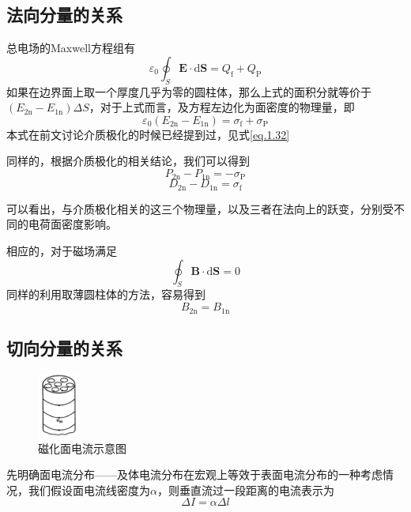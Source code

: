 		\subsection{法向分量的关系}
			总电场的Maxwell方程组有
				\begin{equation}
					\varepsilon_{0} \oint_{S} \boldsymbol{E} \cdot \mathrm{d} \boldsymbol{S}=Q_{\mathrm{f}}+Q_{\mathrm{P}}
				\end{equation}
			如果在边界面上取一个厚度几乎为零的圆柱体，那么上式的面积分就等价于$\left(E_{2 \mathrm{n}}-E_{1 \mathrm{n}}\right) \Delta S$，对于上式而言，及方程左边化为面密度的物理量，即
				\begin{equation}
					\varepsilon_{0}\left(E_{2 \mathrm{n}}-E_{1 \mathrm{n}}\right)=\sigma_{\mathrm{f}}+\sigma_{\mathrm{P}}
				\end{equation}
			本式在前文讨论介质极化的时候已经提到过，见式\ref{eq.1.32}

			同样的，根据介质极化的相关结论，我们可以得到
			\begin{equation}
				P_{2 \mathrm{n}}-P_{1 \mathrm{n}}=-\sigma_{\mathrm{P}}
			\end{equation}
			\begin{equation}
				\boxed{D_{2 \mathrm{n}}-D_{1 \mathrm{n}}=\sigma_{\mathrm{f}}}
			\end{equation}

			可以看出，与介质极化相关的这三个物理量，以及三者在法向上的跃变，分别受不同的电荷面密度影响。

			相应的，对于磁场满足
			\begin{equation}
				\oint_{S} \boldsymbol{B} \cdot \mathrm{d} \boldsymbol{S}=0
			\end{equation}
			同样的利用取薄圆柱体的方法，容易得到
			\begin{equation}
				\boxed{B_{2 \mathrm{n}}=B_{1 \mathrm{n}}}
			\end{equation}
		\subsection{切向分量的关系}
		\begin{figure}%
	      \centering
	      \includegraphics[width=0.12\textwidth]{figs/磁化面电流示意图.jpg}
	      \caption{磁化面电流示意图}
	      \end{figure}
			先明确面电流分布——及体电流分布在宏观上等效于表面电流分布的一种考虑情况，我们假设面电流线密度为$\alpha$，则垂直流过一段距离的电流表示为
			\begin{equation}
				\Delta I=\alpha \Delta l
			\end{equation}

